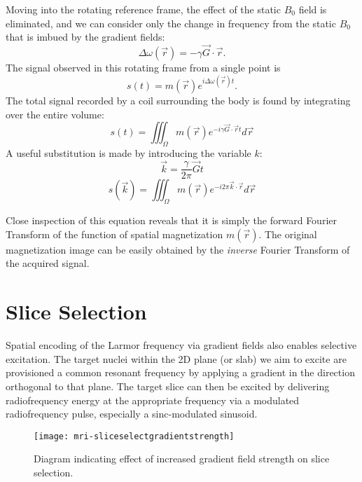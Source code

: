 Moving into the rotating reference frame, the effect of the static $B_0$ field is eliminated, and we can consider only the change in frequency from the static $B_0$ that is imbued by the gradient fields:
\begin{equation}
\Delta\omega(\vec{r}) = -\gamma\vec{G}\cdot\vec{r}.
\end{equation}
The signal observed in this rotating frame from a single point is
\begin{equation}
s(t) = m(\vec{r})e^{i\Delta\omega(\vec{r})t}.
\end{equation}
The total signal recorded by a coil surrounding the body is found by integrating over the entire volume:
\begin{equation}
s(t) = \iiint_{\Omega}m(\vec{r})e^{-i\gamma \vec{G}\cdot\vec{r}t}d\vec{r}
\end{equation}
A useful substitution is made by introducing the variable $k$:
\begin{equation}
\vec{k} = \frac{\gamma}{2\pi} \vec{G}t
\end{equation}
\begin{equation}
s(\vec{k}) = \iiint_{\Omega}m(\vec{r})e^{-i2\pi \vec{k}\cdot\vec{r}}d\vec{r}
\end{equation}

Close inspection of this equation reveals that it is simply the forward Fourier Transform of the function of spatial magnetization $m(\vec{r})$. The original magnetization image can be easily obtained by the \textit{inverse} Fourier Transform of the acquired signal.
\section{Slice Selection}
Spatial encoding of the Larmor frequency via gradient fields also enables selective excitation. The target nuclei within the 2D plane (or slab) we aim to excite are provisioned a common resonant frequency by applying a gradient in the direction orthogonal to that plane. The target slice can then be excited by delivering radiofrequency energy at the appropriate frequency via a modulated radiofrequency pulse, especially a sinc-modulated sinusoid. 
\begin{figure}[ht]
	\centering
	
		\texttt{[image: mri-sliceselectgradientstrength]}
		
	\caption{Diagram indicating effect of increased gradient field strength on slice selection.}\label{fig:mri:sliceselectgradstrength}
\end{figure} 

